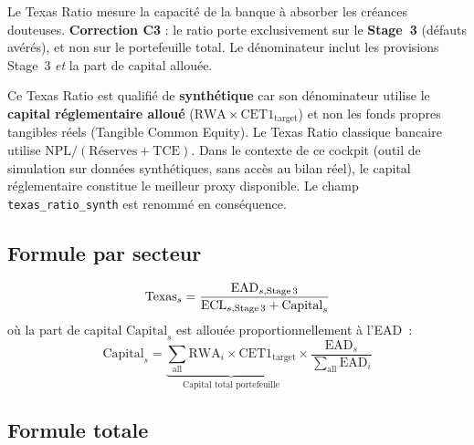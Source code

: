\documentclass[12pt,a4paper]{article}
\begin{document}
\begin{definitionbox}
Le Texas Ratio mesure la capacit\'e de la banque \`a absorber les cr\'eances douteuses. \textbf{Correction C3} : le ratio porte exclusivement sur le \textbf{Stage~3} (d\'efauts av\'er\'es), et non sur le portefeuille total. Le d\'enominateur inclut les provisions Stage~3 \emph{et} la part de capital allou\'ee.
\end{definitionbox}

\begin{warningbox}
Ce Texas Ratio est qualifi\'e de \textbf{synth\'etique} car son d\'enominateur utilise le \textbf{capital r\'eglementaire allou\'e} ($\text{RWA} \times \text{CET1}_{\text{target}}$) et non les fonds propres tangibles r\'eels (Tangible Common Equity). Le Texas Ratio classique bancaire utilise $\text{NPL} / (\text{R\'eserves} + \text{TCE})$. Dans le contexte de ce cockpit (outil de simulation sur donn\'ees synth\'etiques, sans acc\`es au bilan r\'eel), le capital r\'eglementaire constitue le meilleur proxy disponible. Le champ \texttt{texas\_ratio\_synth} est renomm\'e en cons\'equence.
\end{warningbox}

\subsection{Formule par secteur}

\begin{formulebox}
\begin{equation}
    \text{Texas}_s = \frac{\text{EAD}_{s,\text{Stage\,3}}}{\text{ECL}_{s,\text{Stage\,3}} + \text{Capital}_s}
    \label{eq:texas_sector}
\end{equation}
o\`u la part de capital $\text{Capital}_s$ est allou\'ee proportionnellement \`a l'EAD~:
\begin{equation}
    \text{Capital}_s = \underbrace{\sum_{\text{all}} \text{RWA}_i \times \text{CET1}_{\text{target}}}_{\text{Capital total portefeuille}} \times \frac{\text{EAD}_s}{\sum_{\text{all}} \text{EAD}_i}
    \label{eq:capital_share}
\end{equation}
\end{formulebox}

\subsection{Formule totale}
\end{document}

